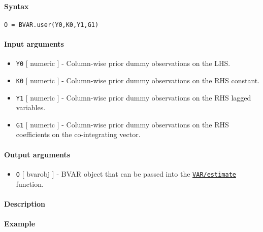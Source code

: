 


	\paragraph{Syntax}

\begin{verbatim}
O = BVAR.user(Y0,K0,Y1,G1)
\end{verbatim}

\paragraph{Input arguments}

\begin{itemize}
\item
  \texttt{Y0} {[} numeric {]} - Column-wise prior dummy observations on
  the LHS.
\item
  \texttt{K0} {[} numeric {]} - Column-wise prior dummy observations on
  the RHS constant.
\item
  \texttt{Y1} {[} numeric {]} - Column-wise prior dummy observations on
  the RHS lagged variables.
\item
  \texttt{G1} {[} numeric {]} - Column-wise prior dummy observations on
  the RHS coefficients on the co-integrating vector.
\end{itemize}

\paragraph{Output arguments}

\begin{itemize}
\itemsep1pt\parskip0pt
\item
  \texttt{O} {[} bvarobj {]} - BVAR object that can be passed into the
  \href{VAR/estimate}{\texttt{VAR/estimate}} function.
\end{itemize}

\paragraph{Description}

\paragraph{Example}


